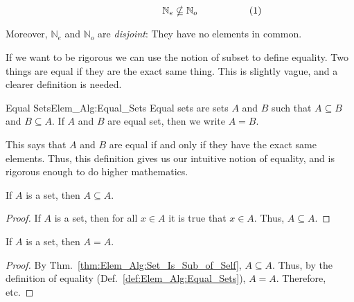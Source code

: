 \documentclass[crop=false,class=book,oneside]{standalone}
\begin{document}
\begin{lexample}
\begin{subequations}
                    \hfill
                    \begin{minipage}{0.49\textwidth}
                        \centering
                        \begin{equation}
                            \mathbb{N}_{e}\nsubseteq\mathbb{N}_{o}
                        \end{equation}
                    \end{minipage}
                \end{subequations}
                \par\vspace{2.5ex}
                Moreover, $\mathbb{N}_{e}$ and $\mathbb{N}_{o}$ are
                \textit{disjoint}: They have no elements in common.
            \end{lexample}
            If we want to be rigorous we can use the notion of
            subset to define equality. Two things are equal if they
            are the exact same thing. This is slightly vague, and a
            clearer definition is needed.
            \begin{ldefinition}{Equal Sets}{Elem_Alg:Equal_Sets}
                Equal sets are sets $A$ and $B$ such that
                $A\subseteq{B}$ and $B\subseteq{A}$. If $A$ and $B$
                are equal set, then we write $A=B$.
            \end{ldefinition}
            This says that $A$ and $B$ are equal if and only if
            they have the exact same elements. Thus, this definition
            gives us our intuitive notion of equality, and is
            rigorous enough to do higher mathematics.
            \begin{theorem}
                \label{thm:Elem_Alg:Set_Is_Sub_of_Self}%
                If $A$ is a set, then $A\subseteq{A}$.
            \end{theorem}
            \begin{proof}
                If $A$ is a set, then for all
                $x\in{A}$ it is true that $x\in{A}$.
                Thus, $A\subseteq{A}$.
            \end{proof}
            \begin{theorem}
                If $A$ is a set, then $A=A$.
            \end{theorem}
            \begin{proof}
                By Thm.~\ref{thm:Elem_Alg:Set_Is_Sub_of_Self},
                $A\subseteq{A}$. Thus, by the definition of
                equality (Def.~\ref{def:Elem_Alg:Equal_Sets}),
                $A=A$. Therefore, etc.
            \end{proof}
\end{document}
